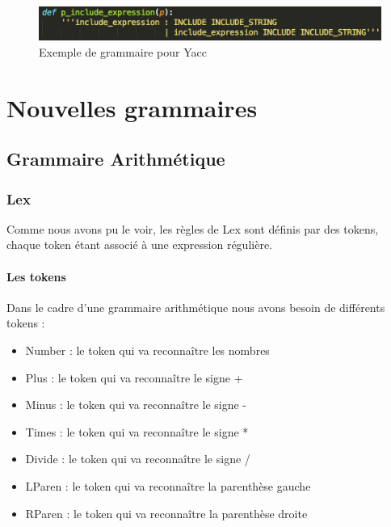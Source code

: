 \documentclass[a4paper,12pt]{article}
\begin{document}
		\begin{figure}[h!]
				\begin{center}
					\includegraphics[scale=0.45]{images/yaccC}
					\caption{Exemple de grammaire pour Yacc}
				\end{center}
		\end{figure}



\section{Nouvelles grammaires}

	\subsection{Grammaire Arithmétique}

		\subsubsection{Lex}
			
			Comme nous avons pu le voir, les règles de Lex sont définis par des tokens, chaque token étant associé à une expression régulière. 

			\paragraph{Les tokens}

				Dans le cadre d'une grammaire arithmétique nous avons besoin de différents tokens : 
				\begin{itemize}
					\item Number : le token qui va reconnaître les nombres
					\item Plus : le token qui va reconnaître le signe +
					\item Minus : le token qui va reconnaître le signe -
					\item Times : le token qui va reconnaître le signe *
					\item Divide : le token qui va reconnaître le signe /
					\item LParen : le token qui va reconnaître la parenthèse gauche
					\item RParen : le token qui va reconnaître la parenthèse droite
				\end{itemize}
\end{document}
